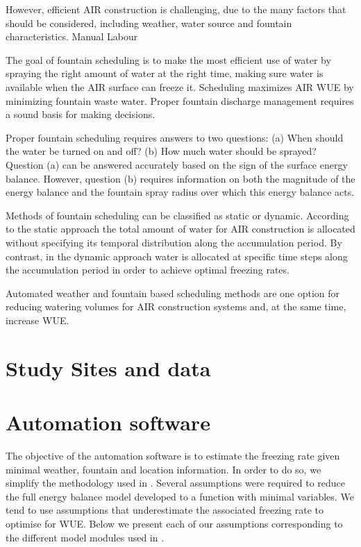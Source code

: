 \documentclass[utf8]{frontiersSCNS}
\begin{document}
However, efficient AIR construction is challenging, due to the many factors that should be considered, including
weather, water source and fountain characteristics. Manual Labour

The goal of fountain scheduling is to make the most
efficient use of water by spraying the right amount of water at the right time, making sure water is available
when the AIR surface can freeze it. Scheduling maximizes AIR WUE by minimizing fountain waste water. Proper
fountain discharge management requires a sound basis for making decisions. 

Proper fountain scheduling requires answers to two questions: (a) When should the water be turned on and off?
(b) How much water should be sprayed? Question (a) can be answered accurately based on the sign of the surface
energy balance. However, question (b) requires information on both the magnitude of the energy balance and the
fountain spray radius over which this energy balance acts.  

Methods of fountain scheduling can be classified as static or dynamic. According to the static approach the
total amount of water for AIR construction is allocated without specifying its temporal distribution along the
accumulation period. By contrast, in the dynamic approach water is allocated at specific time steps along the
accumulation period in order to achieve optimal freezing rates. 

Automated weather and fountain based scheduling methods are one option for reducing watering volumes for AIR
construction systems and, at the same time, increase WUE.

\section{Study Sites and data}

\section{Automation software}
The objective of the automation software is to estimate the freezing rate given minimal weather, fountain and
location information. In order to do so, we simplify the methodology used in \cite{Balasubramanian_2022}.
Several assumptions were required to reduce the full energy balance model developed to a function with minimal
variables. We tend to use assumptions that underestimate the associated freezing rate to optimise for WUE. Below
we present each of our assumptions corresponding to the different model modules used in
\cite{Balasubramanian_2022}. 
\end{document}
